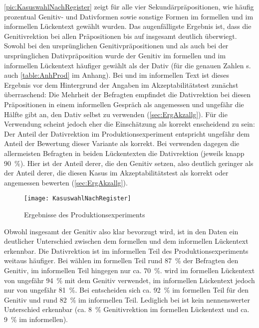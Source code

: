 \autoref{pic:KasuswahlNachRegister} zeigt für alle vier Sekundärpräpositionen, wie häufig prozentual Genitiv- und Dativformen sowie sonstige Formen im formellen und im informellen Lückentext gewählt wurden. 
Das augenfälligste Ergebnis ist, dass die Genitivrektion bei allen Präpositionen bis auf \gegenueber{} insgesamt deutlich überwiegt.
Sowohl bei den ursprünglichen Genitivpräpositionen \wegen{} und \waehrend{} als auch bei der ursprünglichen Dativpräposition \dank{} wurde der Genitiv im formellen und im informellen Lückentext häufiger gewählt als der Dativ (für die genauen Zahlen s. auch \autoref{table:AnhProd} im Anhang). 
Bei \wegen{} und \waehrend{} im informellen Text ist dieses Ergebnis vor dem Hintergrund der Angaben im Akzeptabilitätstest zunächst überraschend: 
Die Mehrheit der Befragten empfindet die Dativrektion bei diesen Präpositionen in einem informellen Gespräch als angemessen und ungefähr die Hälfte gibt an, den Dativ selbst zu verwenden (\autoref{sec:ErgAkzallg}). 
Für die Verwendung scheint jedoch eher die Einschätzung als korrekt enscheidend zu sein: 
Der Anteil der Dativrektion im Produktionsexperiment entspricht ungefähr dem Anteil der Bewertung dieser Variante als korrekt. 
Bei \gegenueber{} verwenden dagegen die allermeisten Befragten in beiden Lückentexten die Dativrektion (jeweils knapp 90~\%).
Hier ist der Anteil derer, die den Genitiv setzen, also deutlich geringer als der Anteil derer, die diesen Kasus im Akzeptabilitätstest als korrekt oder angemessen bewerten (\autoref{sec:ErgAkzallg}). 
\begin{figure}
\centering
\texttt{[image: KasuswahlNachRegister]}
\caption{Ergebnisse des Produktionsexperiments}
\label{pic:KasuswahlNachRegister}
\end{figure}

Obwohl insgesamt der Genitiv also klar bevorzugt wird, ist in den Daten ein deutlicher Unterschied zwischen dem formellen und dem informellen Lückentext erkennbar.
Die Dativrektion ist im informellen Teil des Produktionsexperiments weitaus häufiger.
Bei \wegen{} wählen im formellen Teil rund 87~\% der Befragten den Genitiv, im informellen Teil hingegen nur ca. 70~\%. 
 wird im formellen Lückentext von ungefähr 94~\% mit dem Genitiv verwendet, im informellen Lückentext jedoch nur von ungefähr 81~\%. 
Bei \dank{} entscheiden sich ca. 92~\% im formellen Teil für den Genitiv und rund 82~\% im informellen Teil. 
Lediglich bei \gegenueber{} ist kein nennenswerter Unterschied erkennbar (ca. 8~\% Genitivrektion im formellen Lückentext und ca. 9~\% im informellen). 

